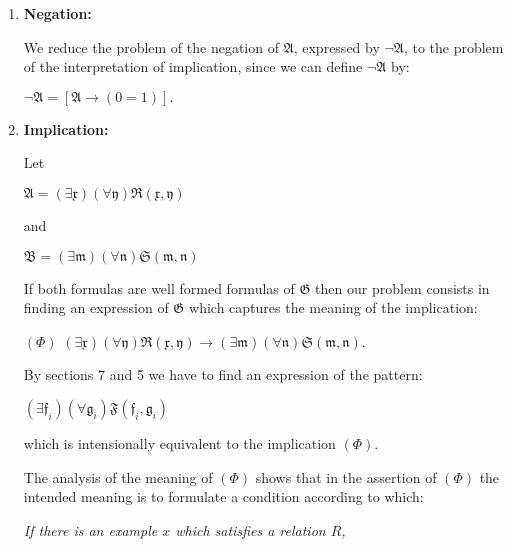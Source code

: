 \documentclass[12pt]{article}
\begin{document}
\begin{enumerate}
\item \textbf{Negation:}

We reduce the problem of the negation of $\mathfrak{A}$, expressed by $\neg \mathfrak{A}$, to the problem of the interpretation of implication, since we can define $\neg \mathfrak{A}$ by:

\begin{center}
$\neg \mathfrak{A} = [\mathfrak{A} \rightarrow (0 = 1)].$
\end{center}

\item \textbf{Implication:}

Let 

\begin{center}
$\mathfrak{A} = (\exists \mathfrak{x}) (\forall \mathfrak{y}) \mathfrak{R} (\mathfrak{x}, \mathfrak{y})$
\end{center}

and 

\begin{center}
$\mathfrak{B} = (\exists \mathfrak{m}) (\forall \mathfrak{n}) \mathfrak{S} (\mathfrak{m}, \mathfrak{n})$
\end{center}

If both formulas are well formed formulas of $\mathfrak{G}$ then our problem consists in finding an expression of $\mathfrak{G}$ which captures the meaning of the implication:

\begin{center} 
$(\Phi)$ \qquad \qquad $(\exists \mathfrak{x}) (\forall \mathfrak{y}) \mathfrak{R} (\mathfrak{x}, \mathfrak{y}) \rightarrow (\exists \mathfrak{m}) (\forall \mathfrak{n}) \mathfrak{S} (\mathfrak{m}, \mathfrak{n}).$
\end{center}

By sections 7 and 5 we have to find an expression of the pattern:

\begin{center}
$(\exists \mathfrak{f}_i) (\forall \mathfrak{g}_i) \mathfrak{F} (\mathfrak{f}_i, \mathfrak{g}_i)$
\end{center}

which is intensionally equivalent to the implication $(\Phi)$.
 
The analysis of the meaning of $(\Phi)$ shows that in the assertion of $(\Phi)$ the intended meaning is to formulate a condition according to which:

\begin{center}
\emph{If there is an example $x$ which satisfies a relation $R$,}


\end{center}
\end{enumerate}
\end{document}
